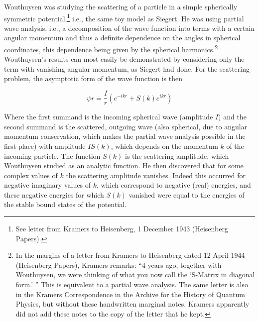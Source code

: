 \documentclass[12pt]{article}
\begin{document}
Wouthuysen was studying the scattering of a particle in a simple spherically symmetric potential,\footnote{See letter from Kramers to Heisenberg, 1 December 1943 (Heisenberg Papers).} i.e., the same toy model as Siegert. He was using partial wave analysis, i.e., a decomposition of the wave function into terms with a certain angular momentum and thus a definite dependence on the angles in spherical coordinates, this dependence being given by the spherical harmonics.\footnote{In the margins of a letter from Kramers to Heisenberg dated 12 April 1944 (Heisenberg Papers), Kramers remarks: ``4 years ago, together with Wouthuysen, we were thinking of what you now call the `S-Matrix in diagonal form.' '' This is equivalent to a partial wave analysis. The same letter is also in the Kramers Correspondence in the Archive for the History of Quantum Physics, but without these handwritten marginal notes. Kramers apparently did not add these notes to the copy of the letter that he kept.} Wouthuysen's results can most easily be demonstrated by considering only the term with vanishing angular momentum, as Siegert had done. For the scattering problem, the asymptotic form of the wave function is then

\begin{equation}
\label{eq:asymptotic}
\psi{r} = \frac{I}{r} \left(e^{-ikr} + S (k) e^{ikr} \right)
 \end{equation}
 
Where the first summand is the incoming spherical wave (amplitude $I$) and the second summand is the scattered, outgoing wave (also spherical, due to angular momentum conservation, which makes the partial wave analysis possible in the first place) with amplitude $I S(k)$, which depends on the momentum $k$ of the incoming particle. The function $S(k)$ is the scattering amplitude, which Wouthuysen studied as an analytic function. He then discovered that for some complex values of $k$ the scattering amplitude vanishes. Indeed this occurred for negative imaginary values of $k$, which correspond to negative (real) energies, and these negative energies for which $S(k)$ vanished were equal to the energies of the stable bound states of the potential.
\end{document}
